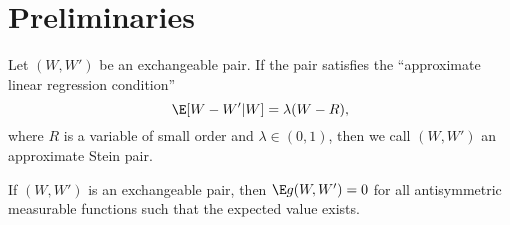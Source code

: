 \section{Preliminaries}
\begin{definition}
  Let $(W, W')$ be an exchangeable pair.  If the pair satisfies the ``approximate linear
  regression condition''
  \begin{equation}
    \label{D:approx-stein-pair}
    \E [W - W' | W] = \lambda (W - R),
  \end{equation}
  where $R$ is a variable of small order and $\lambda \in (0, 1)$, then we call $(W, W')$ an
  approximate Stein pair.
\end{definition}

\begin{lemma}
  \label{L:antisymmetric}
  If $(W, W')$ is an exchangeable pair, then $\E g(W, W') = 0$ for all antisymmetric
  measurable functions such that the expected value exists.
\end{lemma}

